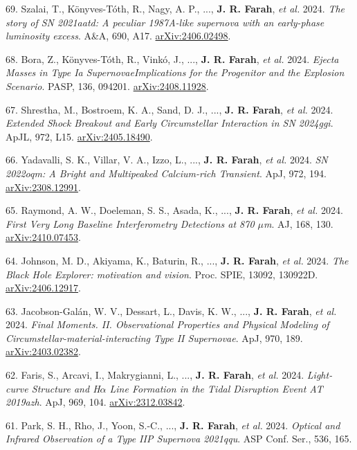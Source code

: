 \documentclass[margin,line]{res}
\newcommand{\aj}{AJ}                      %
\newcommand{\apj}{ApJ}                    %
\newcommand{\apjl}{ApJL}                  %
\newcommand{\aap}{A\&A}                   %
\newcommand{\pasp}{PASP}                  %
\begin{document}
\begin{resume}
69. Szalai, T., K{\"o}nyves-T{\'o}th, R., Nagy, A. P., ..., \textbf{J. R. Farah}, \textit{et al.} 2024. \textit{The story of SN 2021aatd: A peculiar 1987A-like supernova with an early-phase luminosity excess}. \aap, 690, A17. \href{https://arxiv.org/abs/2406.02498}{arXiv:2406.02498}.

68. Bora, Z., K{\"o}nyves-T{\'o}th, R., Vink{\'o}, J., ..., \textbf{J. R. Farah}, \textit{et al.} 2024. \textit{Ejecta Masses in Type Ia Supernovae{\textemdash}Implications for the Progenitor and the Explosion Scenario}. \pasp, 136, 094201. \href{https://arxiv.org/abs/2408.11928}{arXiv:2408.11928}.

67. Shrestha, M., Bostroem, K. A., Sand, D. J., ..., \textbf{J. R. Farah}, \textit{et al.} 2024. \textit{Extended Shock Breakout and Early Circumstellar Interaction in SN 2024ggi}. \apjl, 972, L15. \href{https://arxiv.org/abs/2405.18490}{arXiv:2405.18490}.

66. Yadavalli, S. K., Villar, V. A., Izzo, L., ..., \textbf{J. R. Farah}, \textit{et al.} 2024. \textit{SN 2022oqm: A Bright and Multipeaked Calcium-rich Transient}. \apj, 972, 194. \href{https://arxiv.org/abs/2308.12991}{arXiv:2308.12991}.

65. Raymond, A. W., Doeleman, S. S., Asada, K., ..., \textbf{J. R. Farah}, \textit{et al.} 2024. \textit{First Very Long Baseline Interferometry Detections at 870 {\ensuremath{\mu}}m}. \aj, 168, 130. \href{https://arxiv.org/abs/2410.07453}{arXiv:2410.07453}.

64. Johnson, M. D., Akiyama, K., Baturin, R., ..., \textbf{J. R. Farah}, \textit{et al.} 2024. \textit{The Black Hole Explorer: motivation and vision}. Proc. SPIE, 13092, 130922D. \href{https://arxiv.org/abs/2406.12917}{arXiv:2406.12917}.

63. Jacobson-Gal{\'a}n, W. V., Dessart, L., Davis, K. W., ..., \textbf{J. R. Farah}, \textit{et al.} 2024. \textit{Final Moments. II. Observational Properties and Physical Modeling of Circumstellar-material-interacting Type II Supernovae}. \apj, 970, 189. \href{https://arxiv.org/abs/2403.02382}{arXiv:2403.02382}.

62. Faris, S., Arcavi, I., Makrygianni, L., ..., \textbf{J. R. Farah}, \textit{et al.} 2024. \textit{Light-curve Structure and H{\ensuremath{\alpha}} Line Formation in the Tidal Disruption Event AT 2019azh}. \apj, 969, 104. \href{https://arxiv.org/abs/2312.03842}{arXiv:2312.03842}.

61. Park, S. H., Rho, J., Yoon, S.-C., ..., \textbf{J. R. Farah}, \textit{et al.} 2024. \textit{Optical and Infrared Observation of a Type IIP Supernova 2021qqu}. ASP Conf. Ser., 536, 165.


\end{resume}
\end{document}
